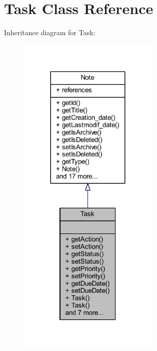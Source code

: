 \hypertarget{class_task}{}\section{Task Class Reference}
\label{class_task}


Inheritance diagram for Task\+:
\nopagebreak
\begin{figure}[H]
\begin{center}
\leavevmode
\includegraphics[width=191pt]{class_task__inherit__graph}
\end{center}
\end{figure}


